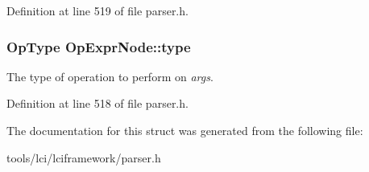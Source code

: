 Definition at line 519 of file parser.\-h.

\hypertarget{struct_op_expr_node_a69ff4baea505db8ed32f4c4027f24ac6}{
\subsubsection[{type}]{\setlength{\rightskip}{0pt plus 5cm}Op\-Type {\bf Op\-Expr\-Node\-::type}}}\label{struct_op_expr_node_a69ff4baea505db8ed32f4c4027f24ac6}
The type of operation to perform on {\itshape args\/}. 

Definition at line 518 of file parser.\-h.



The documentation for this struct was generated from the following file\-:\begin{DoxyCompactItemize}
\item 
tools/lci/lciframework/parser.\-h\end{DoxyCompactItemize}
